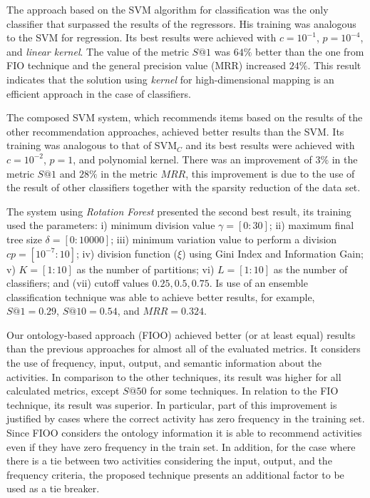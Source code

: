 \documentclass{RITA}
\begin{document}
The approach based on the SVM algorithm for classification was the only classifier that surpassed the results of the regressors. His training was analogous to the SVM for regression. Its best results were achieved with \(c = 10^{-1}\), \(p = 10^{-4}\), and \emph{linear kernel}. The value of the metric \(S@1\) was \(64\%\) better than the one from FIO technique and the general precision value (MRR) increased \(24\%\). This result indicates that the solution using \emph{kernel} for high-dimensional mapping is an efficient approach in the case of classifiers.

The composed SVM system, which recommends items based on the results of the other recommendation approaches, achieved better results than the SVM. Its training was analogous to that of SVM\(_C\) and its best results were achieved with \(c = 10^{-2}\), \(p = 1\), and polynomial kernel. There was an improvement of \(3\%\) in the metric \(S@1\) and \(28\%\) in the metric \(MRR\), this improvement is due to the use of the result of other classifiers together with the sparsity reduction of the data set.

The system using \emph{Rotation Forest} presented the second best result, its training used the parameters: i) minimum division value \(\gamma = [0:30]\); ii) maximum final tree size \(\delta = [0:10000]\); iii) minimum variation value to perform a division \(cp = [10^{-7}:10]\); iv) division function (\(\xi\)) using Gini Index and Information Gain; v) \(K = [1:10]\) as the number of partitions; vi) \(L = [1:10]\) as the number of classifiers; and (vii) cutoff values \(0.25, 0.5, 0.75\). Is use of an ensemble classification technique was able to achieve better results, for example, \(S@1 = 0.29\), \(S@10 = 0.54\), and \(MRR = 0.324\).

Our ontology-based approach (FIOO) achieved better (or at least equal) results than the previous approaches for almost all of the evaluated metrics. It considers the use of frequency, input, output, and semantic information about the activities. In comparison to the other techniques, its result was higher for all calculated metrics, except \(S@50\) for some techniques. In relation to the FIO technique, its result was superior. In particular, part of this improvement is justified by cases where the correct activity has zero frequency in the training set. Since FIOO considers the ontology information it is able to recommend activities even if they have zero frequency in the train set. In addition, for the case where there is a tie between two activities considering the input, output, and the frequency criteria, the proposed technique presents an additional factor to be used as a tie breaker.
\end{document}
